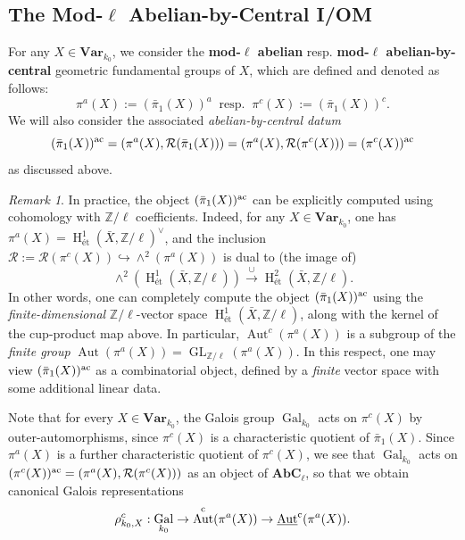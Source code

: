 \documentclass[11pt]{amsart}
\theoremstyle{definition}
\theoremstyle{remark}
\newtheorem{remark}[proposition]{Remark}
\numberwithin{equation}{section}
\DeclareMathOperator{\Aut}{Aut}
\DeclareMathOperator{\Gal}{Gal}
\renewcommand{\H}{\operatorname{H}}
\newcommand{\Z}{\mathbb{Z}}
\newcommand{\Rcal}{\mathcal{R}}
\newcommand{\Autc}{\Aut^{\rm c}}
\newcommand{\UAutc}{\underline{\Aut}^{\rm c}}
\newcommand{\Var}{\mathbf{Var}}
\newcommand{\AbC}{\mathbf{AbC}_{\ell}}
\newcommand{\ac}{{\rm ac}}
\newcommand{\Galk}{{\Gal_{k_0}}}
\begin{document}
\subsection{The Mod-$\ell$ Abelian-by-Central I/OM}
\label{subsection: intro / mod-ell-IOM}

For any $X \in \Var_{k_0}$, we consider the {\bf mod-$\ell$ abelian} resp. {\bf mod-$\ell$ abelian-by-central} geometric fundamental groups of $X$, which are defined and denoted as follows:
\[ \pi^a(X) := (\bar\pi_1(X))^a \ \text{ resp. } \ \pi^c(X) := (\bar\pi_1(X))^c. \]
We will also consider the associated \emph{abelian-by-central datum}
\[ (\bar\pi_1(X))^\ac = (\pi^a(X),\Rcal(\bar\pi_1(X))) = (\pi^a(X),\Rcal(\pi^c(X))) = (\pi^c(X))^\ac \]
as discussed above.

\begin{remark}
  \label{remark: intro / etale-cup-combinatorial}
  In practice, the object $(\bar\pi_1(X))^\ac$ can be explicitly computed using cohomology with $\Z/\ell$ coefficients.
  Indeed, for any $X \in \Var_{k_0}$, one has $\pi^a(X) = \H_{\text{\'et}}^1(\bar X,\Z/\ell)^\vee$, and the inclusion $\Rcal := \Rcal(\pi^c(X)) \hookrightarrow \wedge^2 (\pi^a(X))$ is dual to (the image of) 
  \[ \wedge^2 (\H_{\text{\'et}}^1(\bar X,\Z/\ell)) \xrightarrow{\cup} \H_{\text{\'et}}^2(\bar X,\Z/\ell). \]
  In other words, one can completely compute the object $(\bar\pi_1(X))^\ac$ using the \emph{finite-dimensional} $\Z/\ell$-vector space $\H_{\text{\'et}}^1(\bar X,\Z/\ell)$, along with the kernel of the cup-product map above. 
  In particular, $\Aut^c(\pi^a(X))$ is a subgroup of the \emph{finite group} $\Aut(\pi^a(X)) = \operatorname{GL}_{\Z/\ell}(\pi^a(X))$.
  In this respect, one may view $(\bar\pi_1(X))^\ac$ as a combinatorial object, defined by a \emph{finite} vector space with some additional linear data.
\end{remark}

Note that for every $X \in \Var_{k_0}$, the Galois group $\Galk$ acts on $\pi^c(X)$ by outer-automorphisms, since $\pi^c(X)$ is a characteristic quotient of $\bar\pi_1(X)$.
Since $\pi^a(X)$ is a further characteristic quotient of $\pi^c(X)$, we see that $\Galk$ acts on $(\pi^c(X))^\ac = (\pi^a(X),\Rcal(\pi^c(X)))$ as an object of $\AbC$, so that we obtain canonical Galois representations
\[ \rho_{k_0,X}^c : \Galk \rightarrow \Autc(\pi^a(X)) \rightarrow \UAutc(\pi^a(X)).\]
\end{document}
